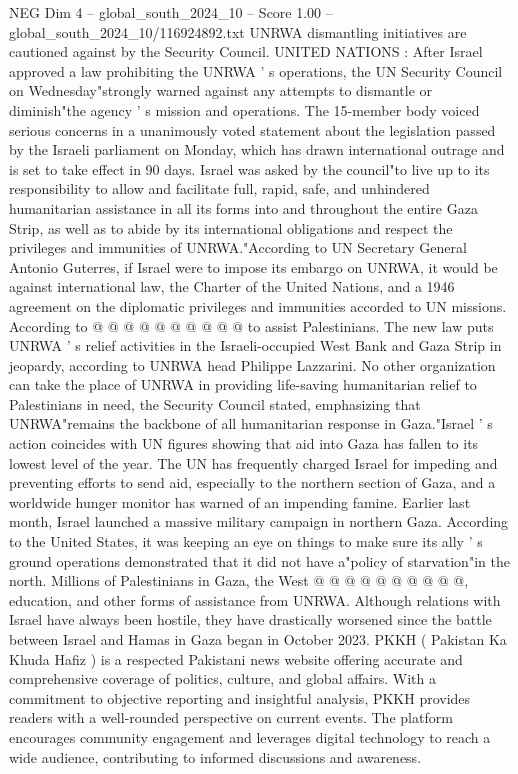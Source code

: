 \begin{textsample}{NEG Dim 4 – global\_south\_2024\_10 – Score 1.00 – global\_south\_2024\_10/116924892.txt}  \label{ex:f4_neg_068}
UNRWA dismantling initiatives are cautioned against by the Security Council.
UNITED NATIONS : After Israel approved a law prohibiting the UNRWA ' s operations, the UN Security Council on Wednesday"strongly warned against any attempts to dismantle or diminish"the agency ' s mission and operations.
The 15-member body voiced serious concerns in a unanimously voted statement about the legislation passed by the Israeli parliament on Monday, which has drawn international outrage and is set to take effect in 90 days.
Israel was asked by the council"to live up to its responsibility to allow and facilitate full, rapid, safe, and unhindered humanitarian assistance in all its forms into and throughout the entire Gaza Strip, as well as to abide by its international obligations and respect the privileges and immunities of UNRWA."According to UN Secretary General Antonio Guterres, if Israel were to impose its embargo on UNRWA, it would be against international law, the Charter of the United Nations, and a 1946 agreement on the diplomatic privileges and immunities accorded to UN missions.
According to @ @ @ @ @ @ @ @ @ @ to assist Palestinians.
The new law puts UNRWA ' s relief activities in the Israeli-occupied West Bank and Gaza Strip in jeopardy, according to UNRWA head Philippe Lazzarini.
No other organization can take the place of UNRWA in providing life-saving humanitarian relief to Palestinians in need, the Security Council stated, emphasizing that UNRWA"remains the backbone of all humanitarian response in Gaza."Israel ' s action coincides with UN figures showing that aid into Gaza has fallen to its lowest level of the year.
The UN has frequently charged Israel for impeding and preventing efforts to send aid, especially to the northern section of Gaza, and a worldwide hunger monitor has warned of an impending famine.
Earlier last month, Israel launched a massive military campaign in northern Gaza.
According to the United States, it was keeping an eye on things to make sure its ally ' s ground operations demonstrated that it did not have a"policy of starvation"in the north.
Millions of Palestinians in Gaza, the West @ @ @ @ @ @ @ @ @ @, education, and other forms of assistance from UNRWA.
Although relations with Israel have always been hostile, they have drastically worsened since the battle between Israel and Hamas in Gaza began in October 2023.
PKKH ( Pakistan Ka Khuda Hafiz ) is a respected Pakistani news website offering accurate and comprehensive coverage of politics, culture, and global affairs.
With a commitment to objective reporting and insightful analysis, PKKH provides readers with a well-rounded perspective on current events.
The platform encourages community engagement and leverages digital technology to reach a wide audience, contributing to informed discussions and awareness.

\end{textsample}
